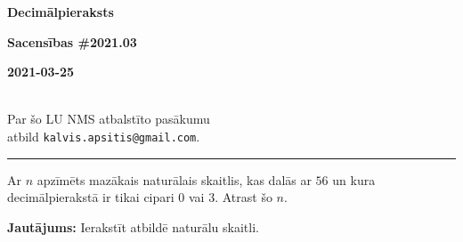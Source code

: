 \documentclass[a4paper,12pt]{article}
\newcommand\answer[1]{}
\begin{document}
\begin{center}
\parbox{3.5cm}{\flushleft\bf Decimālpieraksts} \hfill {\bf\LARGE Sacensības \#2021.03} \hfill \parbox{3.5cm}{\flushright\bf 2021-03-25} \\[2pt]
{\rm\footnotesize Par šo LU NMS atbalstīto pasākumu\\ atbild {\tt kalvis.apsitis@gmail.com}.}
\end{center}

\hrule




\vspace{10pt}
\begin{problem}
Ar $n$ apzīmēts mazākais naturālais skaitlis, kas dalās ar $56$ un kura de\-ci\-māl\-pie\-rak\-stā ir tikai cipari $0$ vai $3$. Atrast šo $n$.

{\bf Jautājums:} Ierakstīt atbildē naturālu skaitli.
\answer{

{\bf Atbilde.} $\mathtt{3003000}$

Tā kā $56=7 \cdot 2^3$, tad ir nepieciešami un pietiekami, lai skaitlis dalītos
ar abām pirmreizinātāju pakāpēm (t.i.\ gan ar $7$, gan ar $8$). 

Lai skaitlis, kura beigās ir nepāru cipars ($3$), dalītos ar $8$, tam galā jāpieraksta trīs nulles.
Savukārt, mazākais skaitlis, kas dalās ar $7$ (no cipariem $3$ un $0$) ir $3003$.
To pārbaudām, izmēģinot dalīt $3$, $33$, $303$, $333$ ar $7$ (un pārliecināties, ka tie nedalās).\\
Tāpēc dalāmībai ar $7$ jāizvēlas nākamais mazākais skaitlis $3003$.

Tātad rezultāts ir $3003 \cdot 1000 = 3003000$.
}
\end{problem}
\end{document}
